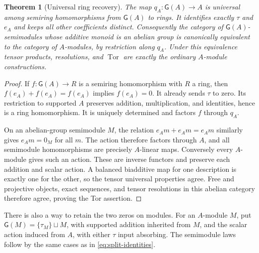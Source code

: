 \documentclass[11pt,a4paper]{article}
\newtheorem{theorem}{Theorem}[section]
\theoremstyle{definition}\newtheorem{definition}[theorem]{Definition}
\newcommand{\G}{\mathsf G}\newcommand{\Tor}{\operatorname{Tor}}\newcommand{\Frac}{\operatorname{Frac}}
\begin{document}
\begin{theorem}[Universal ring recovery]\label{thm:ring-recovery}
The map $q_A:\G(A)\to A$ is universal among semiring homomorphisms from
$\G(A)$ to rings. It identifies exactly $\tau$ and $e_A$ and keeps all
other coefficients distinct. Consequently the category of
$\G(A)$-semimodules whose additive monoid is an abelian group is
canonically equivalent to the category of $A$-modules, by restriction
along $q_A$. Under this equivalence tensor products, resolutions, and
$\Tor$ are exactly the ordinary $A$-module constructions.
\end{theorem}
\begin{proof}
If $f:\G(A)\to R$ is a semiring homomorphism with $R$ a ring, then
$f(e_A)+f(e_A)=f(e_A)$ implies $f(e_A)=0$. It already sends $\tau$ to
zero. Its restriction to supported $A$ preserves addition,
multiplication, and identities, hence is a ring homomorphism. It is
uniquely determined and factors $f$ through $q_A$.

On an abelian-group semimodule $M$, the relation
$e_Am+e_Am=e_Am$ similarly gives $e_Am=0_M$ for all $m$. The action
therefore factors through $A$, and all semimodule homomorphisms are
precisely $A$-linear maps. Conversely every $A$-module gives such an
action. These are inverse functors and preserve each addition and
scalar action. A balanced biadditive map for one description is exactly
one for the other, so the tensor universal properties agree. Free and
projective objects, exact sequences, and tensor resolutions in this
abelian category therefore agree, proving the Tor assertion.
\end{proof}

There is also a way to retain the two zeros on modules. For an $A$-module
$M$, put $\G(M)=\{\tau_M\}\sqcup M$, with supported addition inherited
from $M$, and the scalar action induced from $A$, with either $\tau$
input absorbing. The semimodule laws follow by the same cases as in
\eqref{eq:split-identities}.
\end{document}
